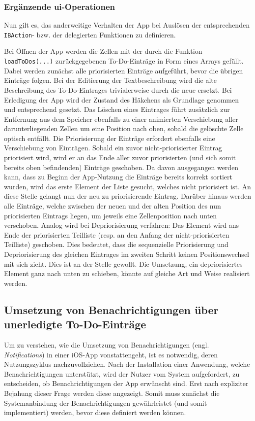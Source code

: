 \subsubsection{Ergänzende \ac{ui}-Operationen}
Nun gilt es, das anderweitige Verhalten der App bei Auslösen der entsprechenden \texttt{IBAction}- bzw. der delegierten  Funktionen zu definieren.

Bei Öffnen der App werden die Zellen mit der durch die Funktion \texttt{loadToDos(...)} zurückgegebenen To-Do-Einträge in Form eines Arrays gefüllt. Dabei werden zunächst alle priorisierten Einträge aufgeführt, bevor die übrigen Einträge folgen. Bei der Editierung der Textbeschreibung wird die alte Beschreibung des To-Do-Eintrages trivialerweise durch die neue ersetzt. Bei Erledigung der App wird der Zustand des Häkchens als Grundlage genommen und entsprechend gesetzt. Das Löschen eines Eintrages führt zusätzlich zur Entfernung aus dem Speicher ebenfalls zu einer animierten Verschiebung aller darunterliegenden Zellen um eine Position nach oben, sobald die gelöschte Zelle optisch entfällt. Die Priorisierung der Einträge erfordert ebenfalls eine Verschiebung von Einträgen. Sobald ein zuvor nicht-priorisierter Eintrag priorisiert wird, wird er an das Ende aller zuvor priorisierten (und sich somit bereits oben befindenden) Einträge geschoben. Da davon ausgegangen werden kann, dass zu Beginn der App-Nutzung die Einträge bereits korrekt sortiert wurden, wird das erste Element der Liste gesucht, welches nicht priorisiert ist. An diese Stelle gelangt nun der neu zu priorisierende Eintrag. Darüber hinaus werden alle Einträge, welche zwischen der neuen und der alten Position des nun priorisierten Eintrags liegen, um jeweils eine Zellenposition nach unten verschoben. Analog wird bei Depriorisierung verfahren: Das Element wird ans Ende der priorisierten Teilliste (resp. an den Anfang der nicht-priorisierten Teilliste) geschoben. Dies bedeutet, dass die sequenzielle Priorisierung und Depriorisierung des gleichen Eintrages im zweiten Schritt keinen Positionswechsel mit sich zieht. Dies ist an der Stelle gewollt. Die Umsetzung, ein depriorisiertes Element ganz nach unten zu schieben, könnte auf gleiche Art und Weise realisiert werden.



\subsection{Umsetzung von Benachrichtigungen über unerledigte To-Do-Einträge}
Um zu verstehen, wie die Umsetzung von Benachrichtigungen (engl. \textit{Notifications}) in einer iOS-App vonstattengeht, ist es notwendig, deren Nutzungszyklus nachzuvollziehen. Nach der Installation einer Anwendung, welche Benachrichtigungen unterstützt, wird der Nutzer vom System aufgefordert, zu entscheiden, ob Benachrichtigungen der App erwünscht sind. Erst nach expliziter Bejahung dieser Frage werden diese angezeigt. Somit muss zunächst die Systemanbindung der Benachrichtigungen gewährleistet (und somit implementiert) werden, bevor diese definiert werden können.

